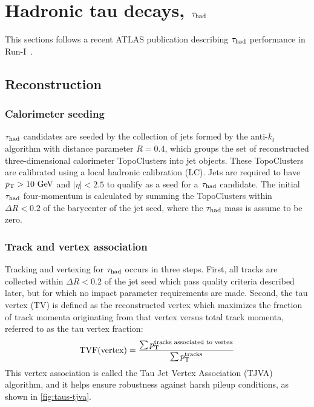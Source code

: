 \section{Hadronic tau decays, $\tau_\text{had}$}
\label{sec:taus-hadrons}

This sections follows a recent ATLAS publication describing $\tau_\text{had}$ performance in Run-I~\cite{PERF-2013-06}.

\subsection{Reconstruction}

\subsubsection{Calorimeter seeding}

$\tau_\text{had}$ candidates are seeded by the collection of jets formed by the anti-$k_t$ algorithm with distance parameter $R=0.4$, which groups the set of reconstructed three-dimensional calorimeter TopoClusters into jet objects. These TopoClusters are calibrated using a local hadronic calibration (LC). Jets are required to have $\pt > 10 \GeV$ and $|\eta| < 2.5$ to qualify as a seed for a $\tau_\text{had}$ candidate. The initial $\tau_\text{had}$ four-momentum is calculated by summing the TopoClusters within $\Delta R < 0.2$ of the barycenter of the jet seed, where the $\tau_\text{had}$ mass is assume to be zero.

\subsubsection{Track and vertex association}

Tracking and vertexing for $\tau_\text{had}$ occurs in three steps. First, all tracks are collected within $\Delta R < 0.2$ of the jet seed which pass quality criteria described later, but for which no impact parameter requirements are made. Second, the tau vertex (TV) is defined as the reconstructed vertex which maximizes the fraction of track momenta originating from that vertex versus total track momenta, referred to as the tau vertex fraction:
%
\begin{equation}
  \begin{split}
    \text{TVF}(\text{vertex}) &= \frac{\sum \pt^\text{tracks associated to vertex}}{\sum \pt^\text{tracks}} \\
  \end{split}
  \label{eqn:taus-tvf}
\end{equation}
%
This vertex association is called the Tau Jet Vertex Association (TJVA) algorithm, and it helps ensure robustness against harsh pileup conditions, as shown in \cref{fig:taus-tjva}.

